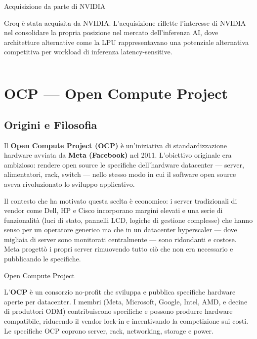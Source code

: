 \documentclass[
  italian,
  openany]{book}
\begin{document}
\begin{calloutnote}{Acquisizione da parte di NVIDIA}

Groq è stata acquisita da NVIDIA. L'acquisizione riflette l'interesse di
NVIDIA nel consolidare la propria posizione nel mercato dell'inferenza
AI, dove architetture alternative come la LPU rappresentavano una
potenziale alternativa competitiva per workload di inferenza
latency-sensitive.

\end{calloutnote}

\begin{center}\rule{0.5\linewidth}{0.5pt}\end{center}

\section{OCP --- Open Compute Project}\label{ocp-open-compute-project}

\subsection{Origini e Filosofia}\label{origini-e-filosofia}

Il \textbf{Open Compute Project (OCP)} è un'iniziativa di
standardizzazione hardware avviata da \textbf{Meta (Facebook)} nel 2011.
L'obiettivo originale era ambizioso: rendere open source le specifiche
dell'hardware datacenter --- server, alimentatori, rack, switch ---
nello stesso modo in cui il software open source aveva rivoluzionato lo
sviluppo applicativo.

Il contesto che ha motivato questa scelta è economico: i server
tradizionali di vendor come Dell, HP e Cisco incorporano margini elevati
e una serie di funzionalità (luci di stato, pannelli LCD, logiche di
gestione complesse) che hanno senso per un operatore generico ma che in
un datacenter hyperscaler --- dove migliaia di server sono monitorati
centralmente --- sono ridondanti e costose. Meta progettò i propri
server rimuovendo tutto ciò che non era necessario e pubblicando le
specifiche.

\begin{calloutdefinition}{Open Compute Project}

L'\textbf{OCP} è un consorzio no-profit che sviluppa e pubblica
specifiche hardware aperte per datacenter. I membri (Meta, Microsoft,
Google, Intel, AMD, e decine di produttori ODM) contribuiscono
specifiche e possono produrre hardware compatibile, riducendo il vendor
lock-in e incentivando la competizione sui costi. Le specifiche OCP
coprono server, rack, networking, storage e power.

\end{calloutdefinition}
\end{document}
